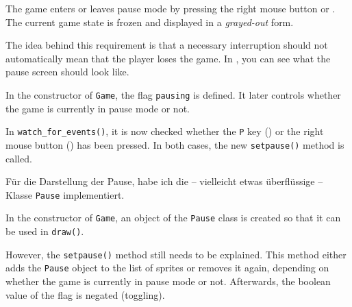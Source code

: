 	The game enters or leaves pause mode by pressing the right mouse button or . The current game state is frozen and displayed in a \emph{grayed-out} form.
\er

The idea behind this requirement is that a necessary interruption should not automatically mean that the player loses the game. In , you can see what the pause screen should look like.


In the constructor of \texttt{Game}, the flag \texttt{pausing} is defined. It later controls whether the game is currently in pause mode or not.

\newpage
{}

In \texttt{watch\_for\_events()}, it is now checked whether the \texttt{P} key () or the right mouse button () has been pressed. In both cases, the new \texttt{setpause()} method is called.


Für die Darstellung der Pause, habe ich die -- vielleicht etwas überflüssige -- Klasse \texttt{Pause} implementiert. 


In the constructor of \texttt{Game}, an object of the \texttt{Pause} class is created so that it can be used in \texttt{draw()}.


However, the \texttt{setpause()} method still needs to be explained. This method either adds the \texttt{Pause} object to the list of sprites or removes it again, depending on whether the game is currently in pause mode or not. Afterwards, the boolean value of the flag is negated (\gls{toggling}).



